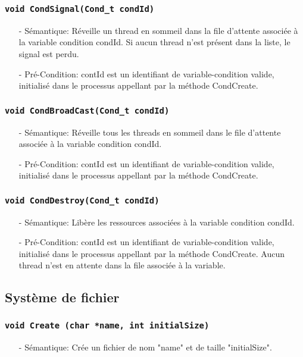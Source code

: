 \documentclass[11pt]{article}
\begin{document}
\subsubsection{\texttt{void CondSignal(Cond\_t condId)}}
\begin{itemize}
\item[-]Sémantique: Réveille un thread en sommeil dans la file d'attente associée à la variable
  condition condId. Si aucun thread n'est présent dans la liste, le signal est perdu.
\item[-]Pré-Condition: contId est un identifiant de variable-condition valide, initialisé dans le processus
  appellant par la méthode CondCreate.
\end{itemize}

\subsubsection{\texttt{void CondBroadCast(Cond\_t condId)}}
\begin{itemize}
\item[-]Sémantique: Réveille tous les threads en sommeil dans le file d'attente associée à la variable
  condition condId.
\item[-]Pré-Condition: contId est un identifiant de variable-condition valide, initialisé dans le processus
  appellant par la méthode CondCreate.
\end{itemize}

\subsubsection{\texttt{void CondDestroy(Cond\_t condId)}}
\begin{itemize}
\item[-]Sémantique: Libère les ressources associées à la variable condition condId. 
\item[-]Pré-Condition: contId est un identifiant de variable-condition valide, initialisé dans le processus
  appellant par la méthode CondCreate. Aucun thread n'est en attente dans la file associée à la variable.
\end{itemize}

\subsection{Système de fichier}

\subsubsection{\texttt{void Create (char *name, int initialSize)}}
\begin{itemize}
\item[-]Sémantique: Crée un fichier de nom "name" et de taille "initialSize".
\end{itemize}
\end{document}
